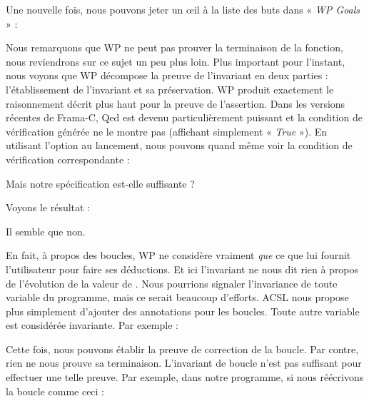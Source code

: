 Une nouvelle fois, nous pouvons jeter un œil à la liste des buts dans « \textit{WP
Goals} » :





Nous remarquons que WP ne peut pas prouver la terminaison de la fonction, nous
reviendrons sur ce sujet un peu plus loin. Plus important pour l'instant, nous
voyons que WP décompose la preuve de l'invariant en deux parties :
l'établissement de l'invariant et sa préservation. WP produit exactement le
raisonnement décrit plus haut pour la preuve de l'assertion. Dans les versions
récentes de Frama-C, Qed est devenu particulièrement puissant et la condition
de vérification générée ne le montre pas (affichant simplement « \textit{True} »).
En utilisant l'option  au lancement, nous pouvons quand
même voir la condition de vérification correspondante :





Mais notre spécification est-elle suffisante ?






Voyons le résultat :





Il semble que non.





En fait, à propos des boucles, WP ne considère vraiment \textit{que} ce que lui
fournit l'utilisateur pour faire ses déductions. Et ici l'invariant ne nous dit
rien à propos de l'évolution de la valeur de . Nous pourrions signaler
l'invariance de toute variable du programme, mais ce serait beaucoup d'efforts.
ACSL nous propose plus simplement d'ajouter des annotations  pour
les boucles. Toute autre variable est considérée invariante. Par exemple :





Cette fois, nous pouvons établir la preuve de correction de la boucle. Par contre,
rien ne nous prouve sa terminaison. L'invariant de boucle n'est pas suffisant pour
effectuer une telle preuve. Par exemple, dans notre programme, si nous réécrivons
la boucle comme ceci :



